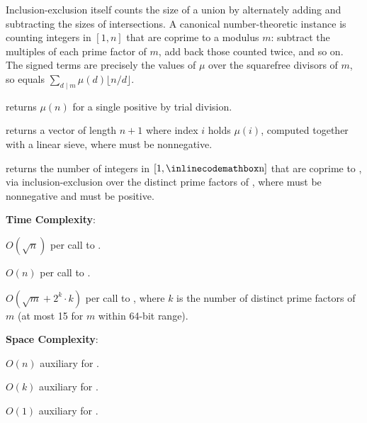 Inclusion-exclusion itself counts the size of a union by alternately adding and subtracting the sizes of intersections. A canonical number-theoretic instance is counting integers in $[1, n]$ that are coprime to a modulus $m$: subtract the multiples of each prime factor of $m$, add back those counted twice, and so on. The signed terms are precisely the values of $\mu$ over the squarefree divisors of $m$, so  equals $\sum_{d \mid m} \mu(d) \lfloor n / d \rfloor$.

\begin{compactitem}
  \item {} returns $\mu(n)$ for a single positive  by trial division.
  \item {} returns a vector of length $n + 1$ where index $i$ holds $\mu(i)$, computed together with a linear sieve, where  must be nonnegative.
  \item {} returns the number of integers in $[1, {\inlinecodemath{n}}]$ that are coprime to , via inclusion-exclusion over the distinct prime factors of , where  must be nonnegative and  must be positive.
\end{compactitem}

\textbf{Time Complexity}:
\begin{compactitem}
  \item $O(\sqrt{n})$ per call to .
  \item $O(n)$ per call to .
  \item $O(\sqrt{m} + 2^{k} \cdot k)$ per call to , where $k$ is the number of distinct prime factors of $m$ (at most 15 for $m$ within 64-bit range).
\end{compactitem}

\textbf{Space Complexity}:
\begin{compactitem}
  \item $O(n)$ auxiliary for .
  \item $O(k)$ auxiliary for .
  \item $O(1)$ auxiliary for .
\end{compactitem}

